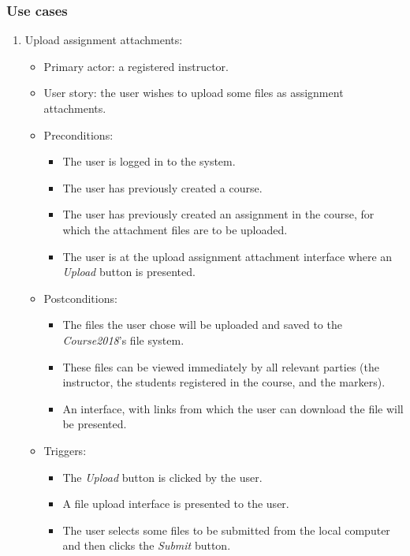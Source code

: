 \subsubsection{Use cases}
\begin{enumerate}

\item Upload assignment attachments:
\begin{itemize}
    \item Primary actor: a registered instructor.
    \item User story: the user wishes to upload some files as assignment
        attachments.
    \item Preconditions:
        \begin{itemize}
            \item The user is logged in to the system.
            \item The user has previously created a course.
            \item The user has previously created an assignment in the course,
                for which the attachment files are to be uploaded.
            \item The user is at the upload assignment attachment interface
                where an \emph{Upload} button is presented.
        \end{itemize}
    \item Postconditions:
        \begin{itemize}
            \item The files the user chose will be uploaded and saved to the
                \emph{Course2018}'s file system.
            \item These files can be viewed immediately by all relevant parties
                (the instructor, the students registered in the course,
                and the markers).
            \item An interface, with links from which the user can
                download the file will be presented.
        \end{itemize}
    \item Triggers:
        \begin{itemize}
            \item The \emph{Upload} button is clicked by the user.
            \item A file upload interface is presented to the user.
            \item The user selects some files to be submitted from the
                local computer and then clicks the \emph{Submit} button.

\end{itemize}
\end{itemize}
\end{enumerate}
